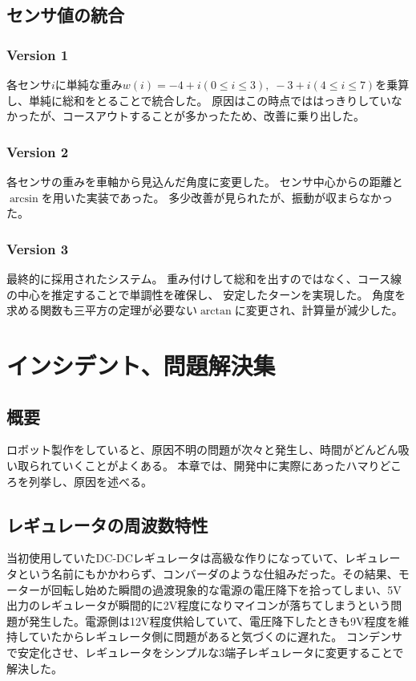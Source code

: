 \documentclass{ltjsreport}
\begin{document}
\section{センサ値の統合}
\subsection{Version 1}
各センサ$i$に単純な重み$w(i) = -4+i(0\leq i \leq 3),\; -3+i (4 \leq i \leq 7)$を乗算し、単純に総和をとることで統合した。
原因はこの時点でははっきりしていなかったが、コースアウトすることが多かったため、改善に乗り出した。

\subsection{Version 2}
各センサの重みを車軸から見込んだ角度に変更した。
センサ中心からの距離と$\arcsin$を用いた実装であった。
多少改善が見られたが、振動が収まらなかった。

\subsection{Version 3}
最終的に採用されたシステム。
重み付けして総和を出すのではなく、コース線の中心を推定することで単調性を確保し、
安定したターンを実現した。
角度を求める関数も三平方の定理が必要ない$\arctan$に変更され、計算量が減少した。





\chapter{インシデント、問題解決集}
\section{概要}
ロボット製作をしていると、原因不明の問題が次々と発生し、時間がどんどん吸い取られていくことがよくある。
本章では、開発中に実際にあったハマりどころを列挙し、原因を述べる。


\section{レギュレータの周波数特性}
当初使用していたDC-DCレギュレータは高級な作りになっていて、レギュレータという名前にもかかわらず、コンバーダのような仕組みだった。その結果、モーターが回転し始めた瞬間の過渡現象的な電源の電圧降下を拾ってしまい、5V出力のレギュレータが瞬間的に2V程度になりマイコンが落ちてしまうという問題が発生した。電源側は12V程度供給していて、電圧降下したときも9V程度を維持していたからレギュレータ側に問題があると気づくのに遅れた。
コンデンサで安定化させ、レギュレータをシンプルな3端子レギュレータに変更することで解決した。
\end{document}
